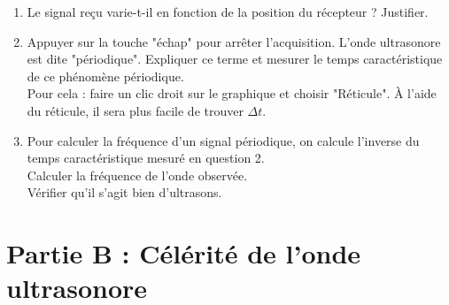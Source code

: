 \documentclass[a4paper,11pt,fleqn]{article}%
\begin{document}
\begin{enumerate}
	\item Le signal reçu varie-t-il en fonction de la position du récepteur ? Justifier.
	\item Appuyer sur la touche "échap" pour arrêter l'acquisition. L'onde ultrasonore est dite "périodique". Expliquer ce terme et mesurer le temps caractéristique de ce phénomène périodique.\\
	Pour cela : faire un clic droit sur le graphique et choisir "Réticule". À l'aide du réticule, il sera plus facile de trouver $\Delta t$.
	\item Pour calculer la fréquence d'un signal périodique, on calcule l'inverse du temps caractéristique mesuré en question 2.\\
	Calculer la fréquence de l'onde observée.\\
	Vérifier qu'il s'agit bien d'ultrasons.
\end{enumerate}

\section*{Partie B : Célérité de l'onde ultrasonore}
\noindent {}
\end{document}
